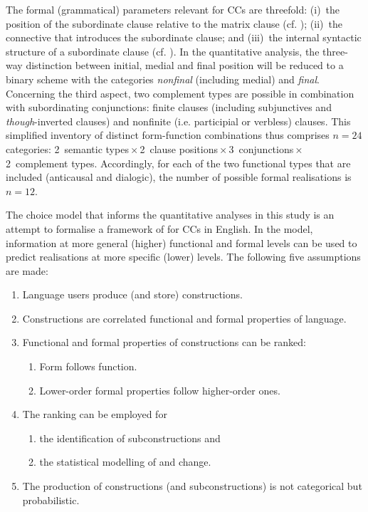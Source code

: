   The formal (grammatical) parameters relevant for CCs are threefold:
(i)~the position of the subordinate clause relative to the matrix clause (cf. );
(ii)~the connective that introduces the subordinate clause; and
(iii)~the internal syntactic structure of a subordinate clause (cf. ). In the quantitative analysis, the three-way distinction between initial, medial and final position will be reduced to a binary scheme with the categories \textit{nonfinal} (including medial) and \textit{final}. Concerning the third aspect, two complement types are possible in combination with subordinating conjunctions: finite clauses (including subjunctives and \textit{though}-inverted clauses) and nonfinite (i.e. participial or verbless) clauses. This simplified inventory of distinct form-function combinations thus comprises $n=24$ categories: 2~semantic types\,×\,2~clause positions\,×\,3~conjunctions\,×\,2~complement types. Accordingly, for each of the two functional types that are included (anticausal and dialogic), the number of possible formal realisations is $n=12$.

The choice model that informs the quantitative analyses in this study is an attempt to formalise a framework of  for CCs in English. In the model, information at more general (higher) functional and formal levels can be used to predict realisations at more specific (lower) levels. The following five assumptions are made:

\begin{enumerate}
\item Language users produce (and store) constructions.
\item Constructions are correlated functional and formal properties of language.
\item Functional and formal properties of constructions can be ranked:
  \begin{enumerate}
  \item Form follows function.
  \item Lower-order formal properties follow higher-order ones.
  \end{enumerate}
  
\item The ranking can be employed for
  \begin{enumerate}
  \item the identification of subconstructions and
  \item the statistical modelling of  and change.
  \end{enumerate}

\item The production of constructions (and subconstructions) is not categorical but probabilistic.
\end{enumerate}

